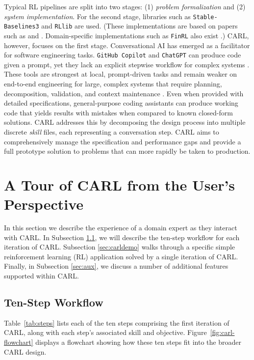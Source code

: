 \documentclass[mnsc,sglanonrev]{informs4}
\begin{document}
Typical RL pipelines are split into two stages: (1) \emph{problem formalization} and (2) \emph{system implementation}. For the second stage, libraries such as \texttt{Stable-Baselines3} and \texttt{RLlib} are used. (These implementations are based on papers such as \cite{schulman_proximal_2017} and \cite{liang_scalable_2021}. Domain-specific implementations such as \texttt{FinRL} also exist \citep{liu_finrl_2022}.)
CARL, however, focuses on the first stage.  Conversational AI has emerged as a facilitator for software engineering tasks.  \texttt{GitHub\hspace{-.3em} Copilot} and \texttt{ChatGPT} can produce code given a prompt, yet they lack an explicit stepwise workflow for complex systems \citep{bai_re-examining_2024}. These tools are strongest at local, prompt-driven tasks and remain weaker on end-to-end engineering for large, complex systems that require planning, decomposition, validation, and context maintenance \citep{khojah_beyond_2024, dong_survey_2025}. Even when provided with detailed specifications, general-purpose coding assistants can produce working code that yields results with mistakes  when compared to known closed-form solutions. CARL addresses this by decomposing the design process into multiple discrete \emph{skill} files, each representing a conversation step.  CARL aims to comprehensively manage the specification and performance gaps and provide a full prototype solution to problems that can more rapidly be taken to production. 




\section{A Tour of CARL from the User's Perspective}
\label{sec:tour}

In this section we describe the experience of a domain expert as they interact with CARL. In Subsection \ref{sec:ten}, we will describe the ten-step workflow for each iteration of CARL. Subsection \ref{sec:carldemo} walks through a specific simple reinforcement learning (RL) application solved by a single iteration of CARL. Finally, in Subsection \ref{sec:aux}, we discuss a number of additional features supported within CARL.

\subsection{Ten-Step Workflow}
\label{sec:ten}

Table~\ref{tab:steps} lists each of the ten steps comprising the first iteration of CARL, along with each step's associated skill and objective. Figure~\ref{fig:carl-flowchart} displays a flowchart showing how these ten steps fit into the broader CARL design. 
\end{document}

